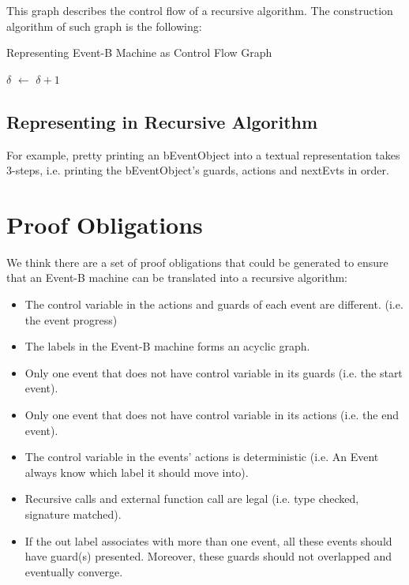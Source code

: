 \documentclass{easychair}
\newcommand*\Let[2]{\State #1 $\gets$ #2}
\def\ForEach{\ForAll}
\begin{document}
This graph describes the control flow of a recursive algorithm. The construction algorithm of such graph is the following:
\begin{algorithm}
  \caption{Representing Event-B Machine as Control Flow Graph
    \label{alg:cfg}}
  \begin{algorithmic}[1]
    \Statex
      \ForEach{event $e \in nextEvts $}
          \Let{$\delta$}{$\delta + 1$}
        \EndIf
      \EndFor
      \State \Return{$\delta$}
    \EndFunction
  \end{algorithmic}
\end{algorithm}


\subsection{Representing in Recursive Algorithm}

For example, pretty printing an bEventObject into a textual representation takes 3-steps, i.e. printing the bEventObject's guards, actions and nextEvts in order.

\section{Proof Obligations}
We think there are a set of proof obligations that could be generated to ensure that an Event-B machine can be translated into a recursive algorithm:
\begin{itemize}
	\item The control variable in the actions and guards of each event are different. (i.e. the event progress)
	\item The labels in the Event-B machine forms an acyclic graph.
	\item Only one event that does not have control variable in its guards (i.e. the start event).
	\item Only one event that does not have control variable in its actions (i.e. the end event).
	\item The control variable in the events' actions is deterministic (i.e. An Event always know which label it should move into).
	\item Recursive calls and external function call are legal (i.e. type checked, signature matched).
	\item If the out label associates with more than one event, all these events should have guard(s) presented. Moreover, these guards should not overlapped and eventually converge.
\end{itemize}
\end{document}
